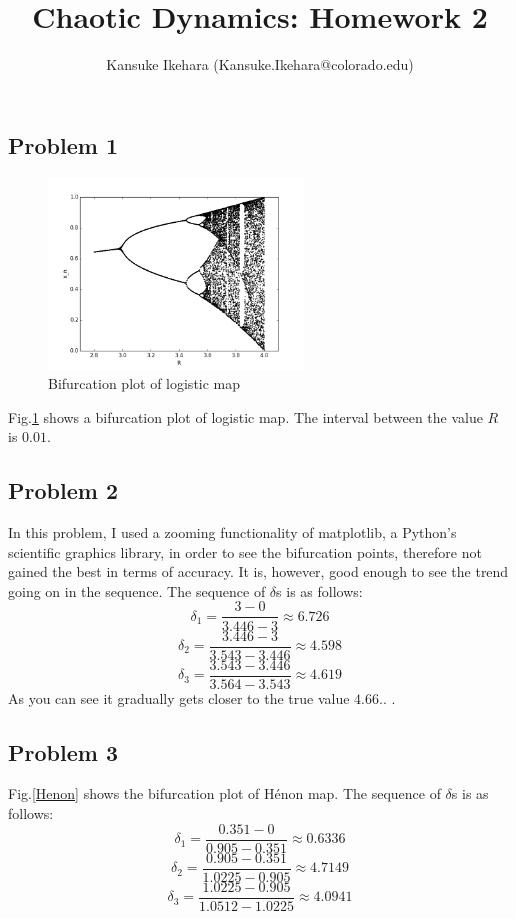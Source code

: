 \documentclass{article}
\title{Chaotic Dynamics: Homework 2}
\author{Kansuke Ikehara (Kansuke.Ikehara@colorado.edu)}
\begin{document}
\maketitle

\subsection*{Problem 1}

\begin{figure}[hb]
	\centering
	\includegraphics[height=2in]{figs/fig1.png}
	\caption{Bifurcation plot of logistic map}
	\label{BifLog}
\end{figure}

Fig.\ref{BifLog} shows a bifurcation plot of logistic map. The interval between the value $R$ is $0.01$.

\subsection*{Problem 2}
In this problem, I used a zooming functionality of matplotlib, a Python's scientific graphics library, in order to see the bifurcation points, therefore not gained the best in terms of accuracy. It is, however, good enough to see the trend going on in the sequence. The sequence of $\delta$s is as follows:
\[
	\delta_{1} = \frac{3 - 0}{3.446 - 3} \approx 6.726
\]
\[
	\delta_{2} = \frac{3.446 - 3}{3.543 - 3.446} \approx 4.598
\]
\[
	\delta_{3} = \frac{3.543 - 3.446}{3.564 - 3.543} \approx 4.619
\]
As you can see it gradually gets closer to the true value $4.66..$ .

\subsection*{Problem 3}
Fig.\ref{Henon} shows the bifurcation plot of H\'enon map. The sequence of $\delta$s is as follows:
\[
	\delta_{1} = \frac{0.351 - 0}{0.905 - 0.351} \approx 0.6336
\]
\[
	\delta_{2} = \frac{0.905 - 0.351}{1.0225 - 0.905} \approx 4.7149
\]
\[
	\delta_{3} = \frac{1.0225 - 0.905}{1.0512 - 1.0225} \approx 4.0941
\]
\end{document}
